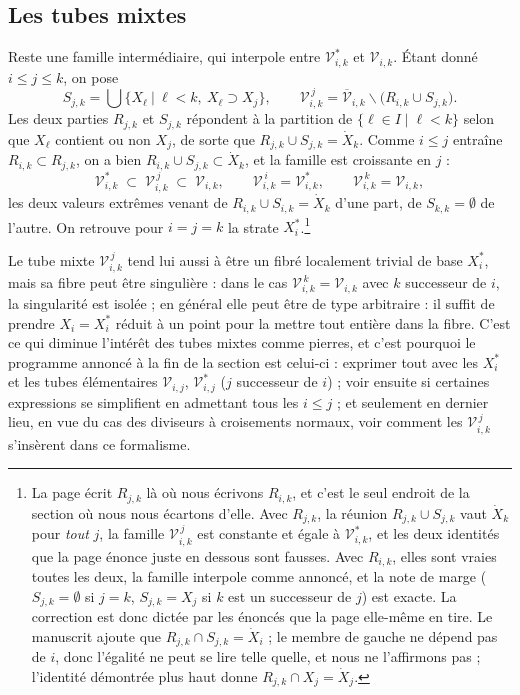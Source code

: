 \documentclass[11pt,a4paper]{article}
\begin{document}
\subsection*{Les tubes mixtes}

Reste une famille intermédiaire, qui interpole entre $\mathcal{V}^{*}_{i,k}$ et
$\mathcal{V}_{i,k}$. Étant donné $i \leq j \leq k$, on pose
\[
  S_{j,k} = \bigcup \bigl\{ X_{\ell} \ \big|\ \ell < k,\ X_{\ell} \supset X_{j} \bigr\},
  \qquad
  \mathcal{V}^{\,j}_{i,k}
  = \overline{\mathcal{V}}_{i,k} \smallsetminus \bigl( R_{i,k} \cup S_{j,k} \bigr).
\]
Les deux parties $R_{j,k}$ et $S_{j,k}$ répondent à la partition de
$\{\ell \in I \mid \ell < k\}$ selon que $X_{\ell}$ contient ou non $X_{j}$, de
sorte que $R_{j,k} \cup S_{j,k} = \dot{X}_{k}$. Comme $i \leq j$ entraîne
$R_{i,k} \subset R_{j,k}$, on a bien $R_{i,k} \cup S_{j,k} \subset \dot{X}_{k}$,
et la famille est croissante en $j$ :
\[
  \mathcal{V}^{*}_{i,k} \;\subset\; \mathcal{V}^{\,j}_{i,k}
  \;\subset\; \mathcal{V}_{i,k},
  \qquad
  \mathcal{V}^{\,i}_{i,k} = \mathcal{V}^{*}_{i,k}, \qquad
  \mathcal{V}^{\,k}_{i,k} = \mathcal{V}_{i,k},
\]
les deux valeurs extrêmes venant de $R_{i,k} \cup S_{i,k} = \dot{X}_{k}$ d'une
part, de $S_{k,k} = \emptyset$ de l'autre. On retrouve pour $i = j = k$ la strate
$X_{i}^{*}$.\footnote{La page écrit $R_{j,k}$ là où nous écrivons $R_{i,k}$, et
c'est le seul endroit de la section où nous nous écartons d'elle. Avec
$R_{j,k}$, la réunion $R_{j,k} \cup S_{j,k}$ vaut $\dot{X}_{k}$ pour \emph{tout}
$j$, la famille $\mathcal{V}^{\,j}_{i,k}$ est constante et égale à
$\mathcal{V}^{*}_{i,k}$, et les deux identités que la page énonce juste en
dessous sont fausses. Avec $R_{i,k}$, elles sont vraies toutes les deux, la
famille interpole comme annoncé, et la note de marge ($S_{j,k} = \emptyset$ si
$j = k$, $S_{j,k} = X_{j}$ si $k$ est un successeur de $j$) est exacte. La
correction est donc dictée par les énoncés que la page elle-même en tire. Le
manuscrit ajoute que $R_{j,k} \cap S_{j,k} = \dot{X}_{i}$ ; le membre de gauche
ne dépend pas de $i$, donc l'égalité ne peut se lire telle quelle, et nous ne
l'affirmons pas ; l'identité démontrée plus haut donne
$R_{j,k} \cap X_{j} = \dot{X}_{j}$.}

Le tube mixte $\mathcal{V}^{\,j}_{i,k}$ tend lui aussi à être un fibré localement
trivial de base $X_{i}^{*}$, mais sa fibre peut être singulière : dans le cas
$\mathcal{V}^{\,k}_{i,k} = \mathcal{V}_{i,k}$ avec $k$ successeur de $i$, la
singularité est isolée ; en général elle peut être de type arbitraire : il suffit
de prendre $X_{i} = X_{i}^{*}$ réduit à un point pour la mettre tout entière dans
la fibre. C'est ce qui diminue l'intérêt des tubes mixtes comme pierres, et
c'est pourquoi le programme annoncé à la fin de la section est celui-ci :
exprimer tout avec les $X_{i}^{*}$ et les tubes élémentaires
$\mathcal{V}_{i,j}$, $\mathcal{V}^{*}_{i,j}$ ($j$ successeur de $i$) ; voir
ensuite si certaines expressions se simplifient en admettant tous les
$i \leq j$ ; et seulement en dernier lieu, en vue du cas des diviseurs à
croisements normaux, voir comment les $\mathcal{V}^{\,j}_{i,k}$ s'insèrent dans
ce formalisme.
\end{document}

